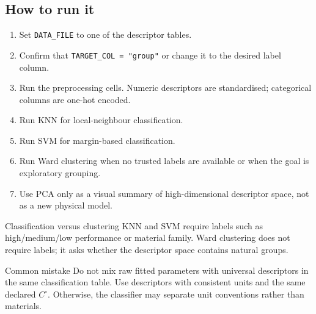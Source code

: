 \documentclass[journal=jacsat,manuscript=article]{achemso}
\begin{document}
\subsection*{How to run it}

\begin{enumerate}
	\item Set \texttt{DATA\_FILE} to one of the descriptor tables.
	\item Confirm that \texttt{TARGET\_COL = "group"} or change it to the
	desired label column.
	\item Run the preprocessing cells. Numeric descriptors are standardised;
	categorical columns are one-hot encoded.
	\item Run KNN for local-neighbour classification.
	\item Run SVM for margin-based classification.
	\item Run Ward clustering when no trusted labels are available or when the
	goal is exploratory grouping.
	\item Use PCA only as a visual summary of high-dimensional descriptor
	space, not as a new physical model.
\end{enumerate}

\begin{greenbox}{Classification versus clustering}
	KNN and SVM require labels such as high/medium/low performance or
	material family. Ward clustering does not require labels; it asks whether
	the descriptor space contains natural groups.
\end{greenbox}

\begin{redbox}{Common mistake}
	Do not mix raw fitted parameters with universal descriptors in the same
	classification table. Use descriptors with consistent units and the same
	declared \(C^\circ\). Otherwise, the classifier may separate unit
	conventions rather than materials.
\end{redbox}



\end{document}

